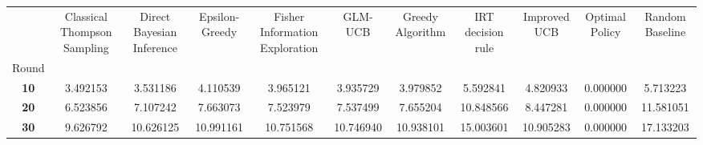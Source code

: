 \begin{tabular}{|c|c|c|c|c|c|c|c|c|c|c|}
\toprule
 & Classical Thompson Sampling & Direct Bayesian Inference & Epsilon-Greedy & Fisher Information Exploration & GLM-UCB & Greedy Algorithm & IRT decision rule & Improved UCB & Optimal Policy & Random Baseline \\
Round &  &  &  &  &  &  &  &  &  &  \\
\midrule
\textbf{10} & 3.492153 & 3.531186 & 4.110539 & 3.965121 & 3.935729 & 3.979852 & 5.592841 & 4.820933 & 0.000000 & 5.713223 \\
\textbf{20} & 6.523856 & 7.107242 & 7.663073 & 7.523979 & 7.537499 & 7.655204 & 10.848566 & 8.447281 & 0.000000 & 11.581051 \\
\textbf{30} & 9.626792 & 10.626125 & 10.991161 & 10.751568 & 10.746940 & 10.938101 & 15.003601 & 10.905283 & 0.000000 & 17.133203 \\
\bottomrule
\end{tabular}
